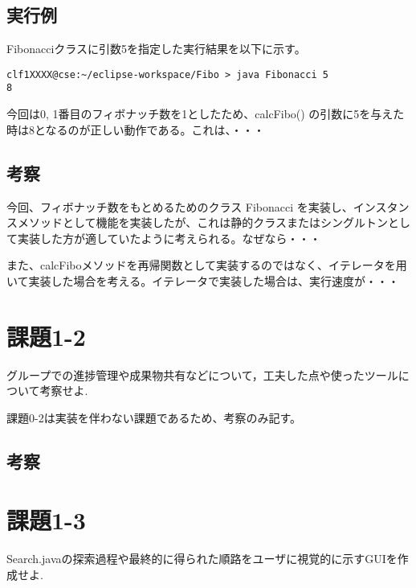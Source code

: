 \documentclass[uplatex,12pt]{jsarticle}
\begin{document}
\subsection{実行例}
Fibonacciクラスに引数5を指定した実行結果を以下に示す。

\begin{lstlisting}
clf1XXXX@cse:~/eclipse-workspace/Fibo > java Fibonacci 5
8
\end{lstlisting}

今回は0, 1番目のフィボナッチ数を1としたため、calcFibo() の引数に5を与えた時は8となるのが正しい動作である。これは、・・・
\subsection{考察}
今回、フィボナッチ数をもとめるためのクラス Fibonacci を実装し、インスタンスメソッドとして機能を実装したが、これは静的クラスまたはシングルトンとして実装した方が適していたように考えられる。なぜなら・・・

また、calcFiboメソッドを再帰関数として実装するのではなく、イテレータを用いて実装した場合を考える。イテレータで実装した場合は、実行速度が・・・


\section{課題1-2}
\begin{screen}
  グループでの進捗管理や成果物共有などについて，工夫した点や使ったツールについて考察せよ.
\end{screen}

課題0-2は実装を伴わない課題であるため、考察のみ記す。

\subsection{考察}



\section{課題1-3}
  Search.javaの探索過程や最終的に得られた順路をユーザに視覚的に示すGUIを作成せよ. 
\end{document}
